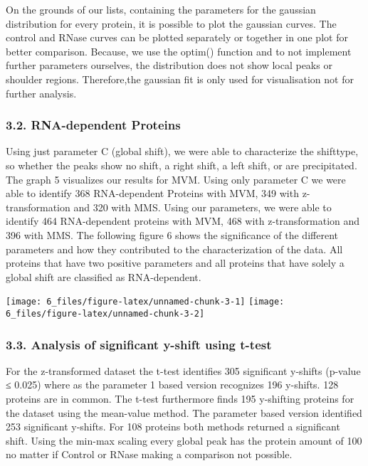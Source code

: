 \documentclass[
  12pt,
]{article}
\begin{document}
On the grounds of our lists, containing the parameters for the gaussian
distribution for every protein, it is possible to plot the gaussian
curves. The control and RNase curves can be plotted separately or
together in one plot for better comparison. Because, we use the optim()
function and to not implement further parameters ourselves, the
distribution does not show local peaks or shoulder regions.
Therefore,the gaussian fit is only used for visualisation not for
further analysis.

\hypertarget{rna-dependent-proteins}{%
\subsubsection{3.2. RNA-dependent
Proteins}\label{rna-dependent-proteins}}

Using just parameter C (global shift), we were able to characterize the
shifttype, so whether the peaks show no shift, a right shift, a left
shift, or are precipitated. The graph 5 visualizes our results for MVM.
Using only parameter C we were able to identify 368 RNA-dependent
Proteins with MVM, 349 with z-transformation and 320 with MMS. Using our
parameters, we were able to identify 464 RNA-dependent proteins with
MVM, 468 with z-transformation and 396 with MMS. The following figure 6
shows the significance of the different parameters and how they
contributed to the characterization of the data. All proteins that have
two positive parameters and all proteins that have solely a global shift
are classified as RNA-dependent.

\texttt{[image: 6\_files/figure-latex/unnamed-chunk-3-1]}
\texttt{[image: 6\_files/figure-latex/unnamed-chunk-3-2]}

\hypertarget{analysis-of-significant-y-shift-using-t-test-1}{%
\subsubsection{3.3. Analysis of significant y-shift using
t-test}\label{analysis-of-significant-y-shift-using-t-test-1}}

For the z-transformed dataset the t-test identifies 305 significant
y-shifts (p-value ≤ 0.025) where as the parameter 1 based version
recognizes 196 y-shifts. 128 proteins are in common. The t-test
furthermore finds 195 y-shifting proteins for the dataset using the
mean-value method. The parameter based version identified 253
significant y-shifts. For 108 proteins both methods returned a
significant shift. Using the min-max scaling every global peak has the
protein amount of 100 no matter if Control or RNase making a comparison
not possible.
\end{document}
